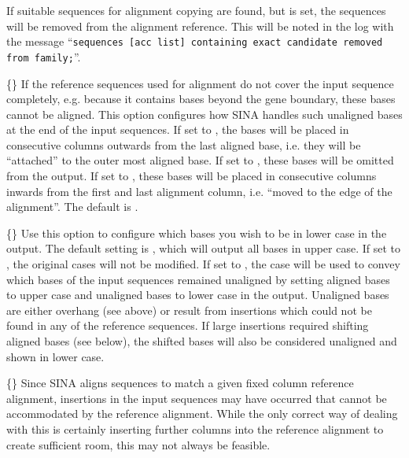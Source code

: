 \documentclass[english,a4paper]{article}
\begin{document}
\begin{Description}
If suitable sequences for alignment copying are found, but  is set, the sequences will be 
removed from the alignment reference. This will be noted in the log with the message 
``\texttt{sequences [acc list] containing exact candidate removed from family;}''.
\item[\Opt{-{}-overhang} \{\Arg{attach}\Bar\Arg{remove}\Bar\Arg{edge}\}]
If the reference sequences used for alignment do not cover the input sequence completely, e.g. because it
contains bases beyond the gene boundary, these bases cannot be aligned. This option configures how
SINA handles such unaligned bases at the end of the input sequences. If set to , the bases 
will be placed in consecutive columns outwards from the last aligned base, i.e. they will be ``attached''
to the outer most aligned base. If set to , these bases will be omitted from the output. If
set to , these bases will be placed in consecutive columns inwards from the first and last
alignment column, i.e. ``moved to the edge of the alignment''. The default is . 
\item[\Opt{-{}-lowercase} \{\Arg{none}\Bar\Arg{original}\Bar\Arg{unaligned}\}]
Use this option to configure which bases you wish to be in lower case in the output. The default
setting is , which will output all bases in upper case. If set to , the original
cases will not be modified. If set to , the case will be used to convey which bases
of the input sequences remained unaligned by setting aligned bases to upper case and unaligned bases 
to lower case in the output. Unaligned bases are either overhang (see  above)
or result from insertions which could not be found in any of the reference sequences. If large
insertions required shifting aligned bases (see  below), the shifted bases will 
also be considered unaligned and shown in lower case. 
\item[\Opt{-{}-insertion} \{\Arg{shift}\Bar\Arg{forbid}\Bar\Arg{remove}\}]
Since SINA aligns sequences to match a given fixed column reference alignment, insertions in the input
sequences may have occurred that cannot be accommodated by the reference alignment. While the only
correct way of dealing with this is certainly inserting further columns into the reference alignment
to create sufficient room, this may not always be feasible. 


\end{Description}
\end{document}
